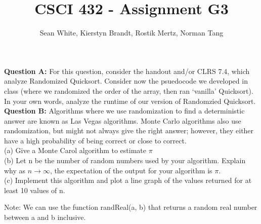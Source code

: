 \documentclass[12pt]{article}
\author{Sean White, Kierstyn Brandt, Rostik Mertz, Norman Tang}
\title{CSCI 432 - Assignment G3}
\begin{document}
\maketitle

\noindent
\textbf{Question A:} For this question, consider the handout and/or CLRS 7.4, which analyze Randomized Quicksort. Consider now the psuedocode we developed in class (where we randomized the order of the array, then ran ‘vanilla’ Quicksort). In your own words, analyze the runtime of our version of Randomzied Quicksort.\\

\noindent
\textbf{Question B:} Algorithms where we use randomization to find a deterministic answer are known as Las Vegas algorithms. Monte Carlo algorithms also use randomization, but might not always give the right answer; however, they either have a high probability of being correct or close to correct.\\

\noindent
(a) Give a Monte Carol algorithm to estimate $\pi$\\

\noindent
(b) Let n be the number of random numbers used by your algorithm. Explain why as $n \rightarrow \infty$, the expectation of the output for your algorithm is $\pi$.\\

\noindent
(c) Implement this algorithm and plot a line graph of the values returned for at least 10 values of n.

\noindent
Note: We can use the function randReal(a, b) that returns a random real number between a and b inclusive.\\
\end{document}
